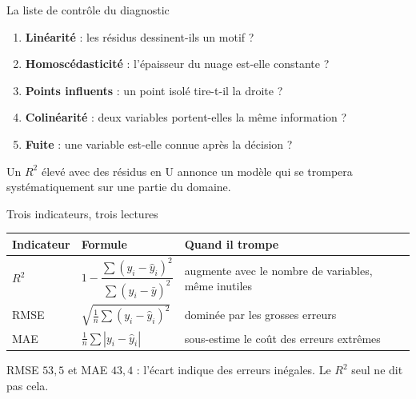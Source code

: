 \begin{frame}{La liste de contrôle du diagnostic}
\begin{enumerate}
  \item \textbf{Linéarité} : les résidus dessinent-ils un motif ?
  \item \textbf{Homoscédasticité} : l'épaisseur du nuage est-elle constante ?
  \item \textbf{Points influents} : un point isolé tire-t-il la droite ?
  \item \textbf{Colinéarité} : deux variables portent-elles la même information ?
  \item \textbf{Fuite} : une variable est-elle connue après la décision ?
\end{enumerate}
\vspace{1.5mm}
\begin{kbox}
Un $R^2$ élevé avec des résidus en U annonce un modèle qui se trompera
systématiquement sur une partie du domaine.
\end{kbox}
\end{frame}

\begin{frame}{Trois indicateurs, trois lectures}
\begin{center}
\small
\begin{tabular}{@{}p{}p{}p{}@{}}
\toprule
\textbf{Indicateur} & \textbf{Formule} & \textbf{Quand il trompe} \\
\midrule
$R^2$ & $1-\dfrac{\sum (y_i-\hat y_i)^2}{\sum (y_i-\bar y)^2}$ & augmente avec le
nombre de variables, même inutiles \\
RMSE & $\sqrt{\frac1n\sum (y_i-\hat y_i)^2}$ & dominée par les grosses erreurs \\
MAE & $\frac1n\sum |y_i-\hat y_i|$ & sous-estime le coût des erreurs extrêmes \\
\bottomrule
\end{tabular}
\end{center}
\vspace{2mm}
\begin{kbox}
RMSE $53{,}5$ et MAE $43{,}4$ : l'écart indique des erreurs inégales. Le $R^2$
seul ne dit pas cela.
\end{kbox}
\end{frame}

